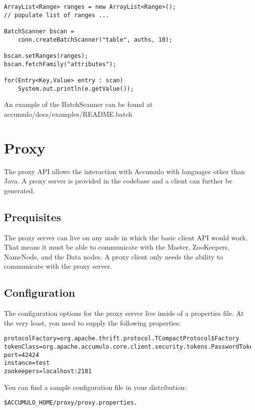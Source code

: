 \small
\begin{verbatim}
ArrayList<Range> ranges = new ArrayList<Range>();
// populate list of ranges ...

BatchScanner bscan =
    conn.createBatchScanner("table", auths, 10);

bscan.setRanges(ranges);
bscan.fetchFamily("attributes");

for(Entry<Key,Value> entry : scan)
    System.out.println(e.getValue());
\end{verbatim}
\normalsize

An example of the BatchScanner can be found at\\
accumulo/docs/examples/README.batch


\section{Proxy}

The proxy API allows the interaction with Accumulo with languages other than Java.
A proxy server is provided in the codebase and a client can further be generated.

\subsection{Prequisites}

The proxy server can live on any node in which the basic client API would work. That
means it must be able to communicate with the Master, ZooKeepers, NameNode, and the
Data nodes. A proxy client only needs the ability to communicate with the proxy server.


\subsection{Configuration}

The configuration options for the proxy server live inside of a properties file. At
the very least, you need to supply the following properties:

\small
\begin{verbatim}
protocolFactory=org.apache.thrift.protocol.TCompactProtocol$Factory
tokenClass=org.apache.accumulo.core.client.security.tokens.PasswordToken
port=42424
instance=test
zookeepers=localhost:2181
\end{verbatim}
\normalsize

You can find a sample configuration file in your distribution:

\small
\begin{verbatim}
$ACCUMULO_HOME/proxy/proxy.properties.
\end{verbatim}
\normalsize

